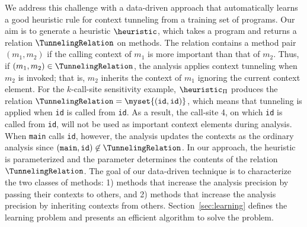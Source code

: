 We address this challenge with a data-driven approach that
automatically learns a good heuristic rule for context tunneling from
a training set of programs.
Our aim is to generate a heuristic $\heuristic$,
which takes a program and returns a relation $\TunnelingRelation$ on methods.
The relation contains a method pair $(m_1, m_2)$ if the calling context of
$m_1$ is more important than that of $m_2$. Thus, if $(m_1, m_2) \in
\TunnelingRelation$, the analysis applies context tunneling when $m_2$ is
invoked; that is, $m_2$ inherits the context of $m_1$ ignoring the current
context element. For the $k$-call-site sensitivity example, $\heuristic_\Pi$
produces the relation $\TunnelingRelation = \myset{({\tt id}, {\tt id})}$,
which means that tunneling is applied when {\tt id} is called from {\tt id}.
As a result, the call-site 4, on which {\tt id} is called from {\tt id}, will
not be used as important context elements during analysis.  When {\tt main}
calls {\tt id}, however, the analysis updates the contexts as the ordinary
analysis since $({\tt main}, {\tt id}) \not\in \TunnelingRelation$.  In our
approach, the heuristic is parameterized and the parameter determines the
contents of the relation $\TunnelingRelation$.  The goal of our data-driven
technique is to characterize the two classes of methods: 1) methods that
increase the analysis precision by passing their contexts to others, and 2)
methods that increase the analysis precision by inheriting contexts from
others. Section~\ref{sec:learning} defines the learning problem and presents
an efficient algorithm to solve the problem.


